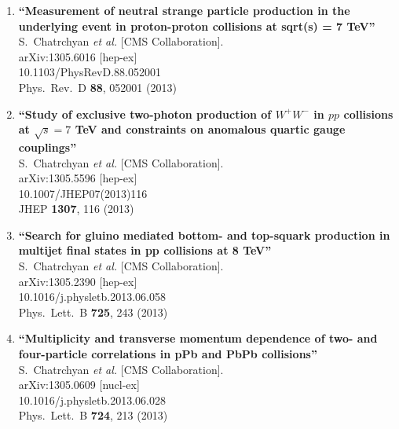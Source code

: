 \documentclass{article}
\begin{document}
\begin{enumerate}
\item%
{\bf ``Measurement of neutral strange particle production in the underlying event in proton-proton collisions at sqrt(s) = 7 TeV''}
  \\{}S.~Chatrchyan {\it et al.}  [CMS Collaboration].
  \\{}arXiv:1305.6016 [hep-ex]
    \\{}10.1103/PhysRevD.88.052001
\\{}Phys.\ Rev.\ D {\bf 88}, 052001 (2013) %


\item%
{\bf ``Study of exclusive two-photon production of $W^+W^-$ in $pp$ collisions at $\sqrt{s} = 7$ TeV and constraints on anomalous quartic gauge couplings''}
  \\{}S.~Chatrchyan {\it et al.}  [CMS Collaboration].
  \\{}arXiv:1305.5596 [hep-ex]
    \\{}10.1007/JHEP07(2013)116
\\{}JHEP {\bf 1307}, 116 (2013) %


\item%
{\bf ``Search for gluino mediated bottom- and top-squark production in multijet final states in pp collisions at 8 TeV''}
  \\{}S.~Chatrchyan {\it et al.}  [CMS Collaboration].
  \\{}arXiv:1305.2390 [hep-ex]
    \\{}10.1016/j.physletb.2013.06.058
\\{}Phys.\ Lett.\ B {\bf 725}, 243 (2013) %


\item%
{\bf ``Multiplicity and transverse momentum dependence of two- and four-particle correlations in pPb and PbPb collisions''}
  \\{}S.~Chatrchyan {\it et al.}  [CMS Collaboration].
  \\{}arXiv:1305.0609 [nucl-ex]
    \\{}10.1016/j.physletb.2013.06.028
\\{}Phys.\ Lett.\ B {\bf 724}, 213 (2013) %



\end{enumerate}
\end{document}

